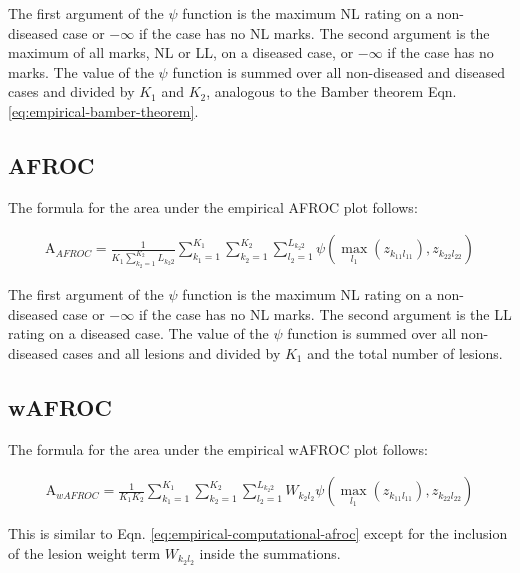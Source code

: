 \documentclass[
]{book}
\begin{document}
The first argument of the \(\psi\) function is the maximum NL rating on a non-diseased case or \(-\infty\) if the case has no NL marks. The second argument is the maximum of all marks, NL or LL, on a diseased case, or \(-\infty\) if the case has no marks. The value of the \(\psi\) function is summed over all non-diseased and diseased cases and divided by \(K_1\) and \(K_2\), analogous to the Bamber theorem Eqn. \eqref{eq:empirical-bamber-theorem}.

\hypertarget{afroc}{%
\subsection{AFROC}\label{afroc}}

The formula for the area under the empirical AFROC plot follows:

\begin{equation}
\begin{aligned}
\text{A}_{AFROC} = \frac{1}{K_1\sum_{k_2=1}^{K_2}L_{k_2 2}}\sum_{k_1=1}^{K_1}\sum_{k_2=1}^{K_2}\sum_{l_2=1}^{L_{k_2 2}} \psi\left ( \max_{l_1}\left (z_{k_11l_11}  \right ),z_{k_22l_22} \right )
\end{aligned}
\label{eq:empirical-computational-afroc}
\end{equation}

The first argument of the \(\psi\) function is the maximum NL rating on a non-diseased case or \(-\infty\) if the case has no NL marks. The second argument is the LL rating on a diseased case. The value of the \(\psi\) function is summed over all non-diseased cases and all lesions and divided by \(K_1\) and the total number of lesions.

\hypertarget{wafroc}{%
\subsection{wAFROC}\label{wafroc}}

The formula for the area under the empirical wAFROC plot follows:

\begin{equation}
\begin{aligned}
\text{A}_{wAFROC} = \frac{1}{K_1K_2}\sum_{k_1=1}^{K_1}\sum_{k_2=1}^{K_2}\sum_{l_2=1}^{L_{k_2 2}} W_{k_2l_2}\psi\left ( \max_{l_1}\left (z_{k_11l_11}  \right ),z_{k_22l_22} \right )
\end{aligned}
\label{eq:empirical-computational-wafroc}
\end{equation}

This is similar to Eqn. \eqref{eq:empirical-computational-afroc} except for the inclusion of the lesion weight term \(W_{k_2l_2}\) inside the summations.
\end{document}
